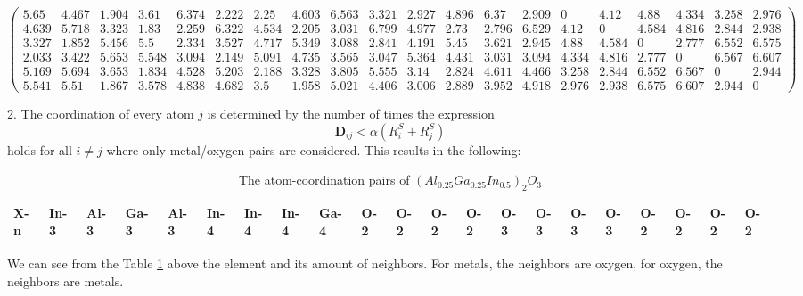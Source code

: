 \documentclass[11pt,oneside,czech,american]{book} %
\theoremstyle{plain}
\theoremstyle{definition}
\begin{document}
$$\begin{pmatrix}
	5.65 & 4.467 & 1.904 & 3.61 & 6.374 & 2.222 & 2.25 & 4.603 & 6.563 & 3.321 & 2.927 & 4.896 & 6.37 & 2.909 & 0 & 4.12 & 4.88 & 4.334 & 3.258 & 2.976\\
	4.639 & 5.718 & 3.323 & 1.83 & 2.259 & 6.322 & 4.534 & 2.205 & 3.031 & 6.799 & 4.977 & 2.73 & 2.796 & 6.529 & 4.12 & 0 & 4.584 & 4.816 & 2.844 & 2.938\\
	3.327 & 1.852 & 5.456 & 5.5 & 2.334 & 3.527 & 4.717 & 5.349 & 3.088 & 2.841 & 4.191 & 5.45 & 3.621 & 2.945 & 4.88 & 4.584 & 0 & 2.777 & 6.552 & 6.575\\
	2.033 & 3.422 & 5.653 & 5.548 & 3.094 & 2.149 & 5.091 & 4.735 & 3.565 & 3.047 & 5.364 & 4.431 & 3.031 & 3.094 & 4.334 & 4.816 & 2.777 & 0 & 6.567 & 6.607\\
	5.169 & 5.694 & 3.653 & 1.834 & 4.528 & 5.203 & 2.188 & 3.328 & 3.805 & 5.555 & 3.14 & 2.824 & 4.611 & 4.466 & 3.258 & 2.844 & 6.552 & 6.567 & 0 & 2.944\\
	5.541 & 5.51 & 1.867 & 3.578 & 4.838 & 4.682 & 3.5 & 1.958 & 5.021 & 4.406 & 3.006 & 2.889 & 3.952 & 4.918 & 2.976 & 2.938 & 6.575 & 6.607 & 2.944 & 0
\end{pmatrix}$$
\normalsize

2. The coordination of every atom $j$ is determined by the number of times the expression $$\bm{D}_{ij} < \alpha(R^S_i + R^S_j)$$ holds for all $i \neq j$ where only metal/oxygen pairs are considered. This results in the following:
\begin{table}[H]
	\tiny
	\centering
	\begin{tabular}{l|llllllllllllllllllll}
		\hline
		X-n & In-3  &Al-3  &	Ga-3 & Al-3 & In-4  & In-4  & In-4  & Ga-4  & O-2  & O-2  & O-2 & O-2 & O-3 & O-3 & O-3 & O-3 & O-2 & O-2  & O-2 & O-2   \\
		\hline
	\end{tabular}
	\caption{The atom-coordination pairs of $(Al_{0.25}Ga_{0.25}In_{0.5})_2 O_3$}
	\label{atom_coordinations}
\end{table}
We can see from the Table \ref{atom_coordinations} above the element and its amount of neighbors. For metals, the neighbors are oxygen, for oxygen, the neighbors are metals.
\end{document}
